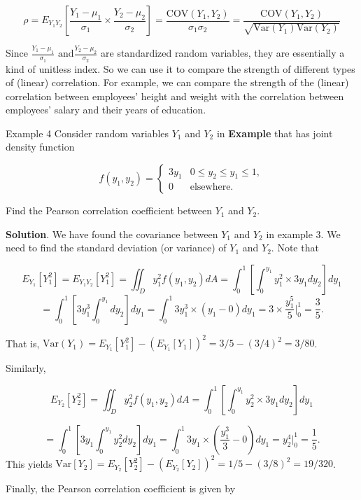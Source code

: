 \documentclass[
]{book}
\begin{document}
\[
\rho = E_{Y_1Y_2}\left[\frac{Y_1-\mu_1}{\sigma_1} \times \frac{Y_2-\mu_2}{\sigma_2} \right] = \frac{\text{COV}(Y_1, Y_2)}{\sigma_1\sigma_2} =  \frac{\text{COV}(Y_1, Y_2)}{\sqrt{\text{Var}(Y_1)\text{Var}(Y_2)}}
\]

Since \(\frac{Y_1-\mu_1}{\sigma_1} \text{ and} \frac{Y_2-\mu_2}{\sigma_2}\) are standardized random variables, they are essentially a kind of unitless index. So we can use it to compare the strength of different types of (linear) correlation. For example, we can compare the strength of the (linear) correlation between employees' height and weight with the correlation between employees' salary and their years of education.

\hfill\break

Example 4 Consider random variables \(Y_1\) and \(Y_2\) in \textbf{Example } that has joint density function

\[
\displaystyle f(y_1,y_2) = \begin{cases} 
 3y_1 & \text{$0 \le y_2 \le y_1 \le 1$}, \\  
 0 & \text{elsewhere}.
 \end{cases}
\]

Find the Pearson correlation coefficient between \(Y_1\) and \(Y_2\).

\textbf{Solution}. We have found the covariance between \(Y_1\) and \(Y_2\) in example 3. We need to find the standard deviation (or variance) of \(Y_1\) and \(Y_2\). Note that

\[
E_{Y_1}[Y_1^2] = E_{Y_1Y_2}[Y_1^2] = \iint_D y_1^2f(y_1,y_2)dA = \int_0^1\left[\int_0^{y_1}y_1^2\times 3y_1 dy_2\right]  dy_1
\]
\[
= \int_0^1\left[3y_1^3\int_0^{y_1}  dy_2\right]  dy_1 =\int_0^1 3y_1^3\times (y_1-0)dy_1 = 3\times \frac{y_1^5}{5}\Bigg|_0^1 = \frac{3}{5}.
\]

That is, \(\text{Var}(Y_1) = E_{Y_1}[Y_1^2] - \left(E_{Y_1}[Y_1] \right)^2 = 3/5-(3/4)^2 = 3/80\).

Similarly,

\[
E_{Y_2}[Y_2^2] = \iint_D y_2^2 f(y_1,y_2)dA = \int_0^1 \left[\int_0^{y_1} y_2^2\times 3y_1 dy_2 \right] dy_1
\]

\[
 = \int_0^1 \left[ 3y_1\int_0^{y_1} y_2^2 dy_2 \right] dy_1 =\int_0^1 3y_1\times (\frac{y_1^3}{3}-0)dy_1=  y_2^4\Bigg|_0^1 = \frac{1}{5}.
\]
This yields \(\text{Var}[Y_2] = E_{Y_2}[Y_2^2] - \left(E_{Y_2}[Y_2] \right)^2 = 1/5 - (3/8)^2 = 19/320\).

Finally, the Pearson correlation coefficient is given by
\end{document}
